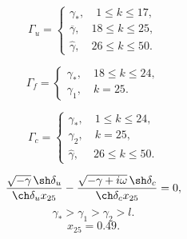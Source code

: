\documentclass[fullscreen=true, unicode, bookmarks=false]{beamer}
\begin{document}
\begin{frame}

\begin{equation}\label{Gamma_u}
    \Gamma_u =\left\{
                \begin{array}{ll}
                  \gamma_*, \quad 1 \leqslant k \leqslant 17,\\
                  \overline{\gamma}, \quad 18 \leqslant k \leqslant 25,\\
                  \hat{\gamma}, \quad 26 \leqslant k \leqslant 50.
                \end{array}
              \right.
\end{equation}

\vfill

\begin{equation}\label{Gamma_f}
    \Gamma_f =\left\{
                \begin{array}{ll}
                  \gamma_*, \quad 18 \leqslant k \leqslant 24,\\
                  \gamma_1, \quad k = 25.
                \end{array}
              \right.
\end{equation}

\vfill

\begin{equation}\label{Gamma_c}
    \Gamma_c =\left\{
                \begin{array}{ll}
                  \gamma_*, \quad 1 \leqslant k \leqslant 24,\\
                  \gamma_2, \quad k = 25,\\
                  \hat{\gamma}, \; \quad 26 \leqslant k \leqslant 50.
                \end{array}
              \right.
\end{equation}

\vfill

\begin{equation}\label{transcendent_equation_P}
\frac{\sqrt{-\gamma} \, \sh \delta_u}{\ch \delta_u x_{25}} - \frac{\sqrt{-\gamma + i \omega} \, \sh \delta_c}{\ch \delta_c x_{25}} = 0,
\end{equation}
\begin{equation}\label{transcendent_equation_cond}
    \gamma_* > \gamma_1 > \gamma_2 > l.
\end{equation}
$$ x_{25}=0.49. $$

\end{frame}
\end{document}

